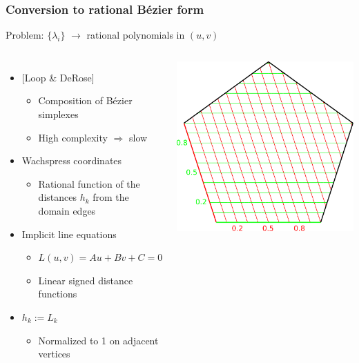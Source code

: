 \documentclass[xcolor=table]{beamer}
\begin{document}
\begin{frame}
  \frametitle{Conversion to rational B\'ezier form}
  \begin{center}
    Problem: $\{\lambda_i\}$ $\rightarrow$ rational polynomials in $(u,v)$
  \end{center}
  \vfill
  \begin{columns}
    \begin{itemize}
    \item {[Loop \& DeRose]}
      \begin{itemize}
      \item Composition of B\'ezier simplexes
      \item High complexity $\Rightarrow$ slow
      \end{itemize}
    \item Wachspress coordinates
      \begin{itemize}
      \item Rational function of the distances $h_k$ from the domain edges
      \end{itemize}
    \item Implicit line equations
      \begin{itemize}
      \item $L(u,v)=Au+Bv+C=0$
      \item Linear signed distance functions
      \end{itemize}
    \item $h_k:=L_k$
      \begin{itemize}
      \item Normalized to 1 on adjacent vertices
      \end{itemize}
    \end{itemize}
    \centering
    \includegraphics[width=\textwidth]{images/h-params.pdf}
  \end{columns}
\end{frame}
\end{document}
